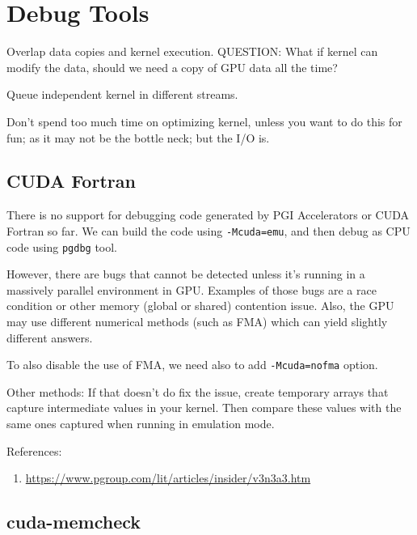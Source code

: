 \chapter{Debug Tools}
\label{chap:Debug_Tools}

Overlap data copies and kernel execution. QUESTION: What if kernel can
modify the data, should we need a copy of GPU data all the time? 

Queue independent kernel in different streams. 

Don't spend too much time on optimizing kernel, unless you want to do
this for fun; as it may not be the bottle neck; but the I/O is. 

\section{CUDA Fortran}

There is no support for debugging code generated by PGI Accelerators or CUDA
Fortran so far. We can build the code using \verb!-Mcuda=emu!, and then debug as
CPU code using \verb!pgdbg! tool.

However, there are bugs that cannot be detected unless it's running in a
massively parallel environment in GPU. Examples of those bugs are a race
condition or other memory (global or shared) contention issue. Also, the GPU may
use different numerical methods (such as FMA) which can yield slightly different
answers.

To also disable the use of FMA, we need also to add \verb!-Mcuda=nofma! option.

Other methods: If that doesn't do fix the issue, create temporary arrays that
capture intermediate values in your kernel. Then compare these values with the
same ones captured when running in emulation mode. 

References:
\begin{enumerate}
  \item \url{https://www.pgroup.com/lit/articles/insider/v3n3a3.htm}
\end{enumerate}


\section{cuda-memcheck}
\label{sec:tool_cudamemcheck}

